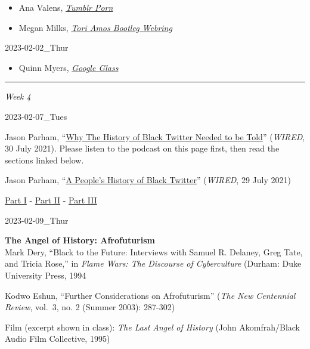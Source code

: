 \documentclass[
  letterpaper,
  DIV=11,
  numbers=noendperiod]{scrartcl}
\providecommand{\tightlist}{%
  \setlength{\itemsep}{0pt}\setlength{\parskip}{0pt}}\usepackage{longtable,booktabs,array}
\begin{document}
\begin{itemize}
\tightlist
\item
  Ana Valens,
  \href{http://www.instarbooks.com/books/tumblr-porn.html}{\emph{Tumblr
  Porn}}
\item
  Megan Milks,
  \href{http://www.instarbooks.com/books/tori-amos-bootleg-webring.html}{\emph{Tori
  Amos Bootleg Webring}}
\end{itemize}

2023-02-02\_Thur

\begin{itemize}
\tightlist
\item
  Quinn Myers,
  \href{http://www.instarbooks.com/books/google-glass.html}{\emph{Google
  Glass}}
\end{itemize}

\begin{center}\rule{0.5\linewidth}{0.5pt}\end{center}

\emph{Week 4}

2023-02-07\_Tues

Jason Parham,
``\href{https://www.wired.com/story/gadget-lab-podcast-514/}{Why The
History of Black Twitter Needed to be Told}'' (\emph{WIRED}, 30 July
2021). Please listen to the podcast on this page first, then read the
sections linked below.

Jason Parham,
``\href{https://www.wired.com/story/black-twitter-oral-history-part-i-coming-together/}{A
People's History of Black Twitter}'' (\emph{WIRED}, 29 July 2021)

\href{https://canvas.emerson.edu/courses/1932613/files/145300027?wrap=1}{Part
I} -
\href{https://canvas.emerson.edu/courses/1932613/files/145300043?wrap=1}{Part
II} -
\href{https://canvas.emerson.edu/courses/1932613/files/145300055?wrap=1}{Part
III}~

2023-02-09\_Thur

\textbf{The Angel of History: Afrofuturism}\\
Mark Dery, ``Black to the Future: Interviews with Samuel R. Delaney,
Greg Tate, and Tricia Rose,'' in \emph{Flame Wars: The Discourse of
Cyberculture} (Durham: Duke University Press, 1994

Kodwo Eshun, ``Further Considerations on Afrofuturism'' (\emph{The New
Centennial Review}, vol.~3, no. 2 (Summer 2003): 287-302)

Film (excerpt shown in class): \emph{The Last Angel of History} (John
Akomfrah/Black Audio Film Collective, 1995)
\end{document}
